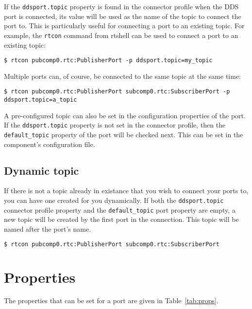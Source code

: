 \documentclass[a4paper,10pt]{article}
\newcommand{\ilcode}[1]{\lstinline|#1|}
\begin{document}
If the \ilcode{ddsport.topic} property is found in the connector profile
when the DDS port is connected, its value will be used as the name of
the topic to connect the port to. This is particularly useful for
connecting a port to an existing topic. For example, the \ilcode{rtcon}
command from rtshell can be used to connect a port to an existing topic:

\ilcode{$ rtcon pubcomp0.rtc:PublisherPort -p ddsport.topic=my_topic}

Multiple ports can, of course, be connected to the same topic at the
same time:

\ilcode{$ rtcon pubcomp0.rtc:PublisherPort subcomp0.rtc:SubscriberPort -p ddsport.topic=a_topic}

A pre-configured topic can also be set in the configuration properties
of the port. If the \ilcode{ddsport.topic} property is not set in the
connector profile, then the \ilcode{default_topic} property of the port
will be checked next. This can be set in the component's configuration
file.

\subsection{Dynamic topic}

If there is not a topic already in existance that you wish to connect
your ports to, you can have one created for you dynamically. If
both the \ilcode{ddsport.topic} connector profile property and the
\ilcode{default_topic} port property are empty, a new topic will be
created by the first port in the connection. This topic will be named
after the port's name.

\ilcode{$ rtcon pubcomp0.rtc:PublisherPort subcomp0.rtc:SubscriberPort}

\section{Properties}
\label{sec:props}

The properties that can be set for a port are given in
Table~\ref{tab:props}.
\end{document}
